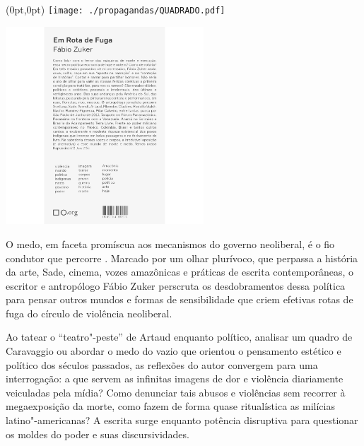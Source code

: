\pagestyle{quadrado}
\label{quadrado}

\begin{textblock*}{5.625in}(0pt,0pt)%
\vspace*{-3.5cm}
\hspace*{-2.77cm}\texttt{[image: ./propagandas/QUADRADO.pdf]}
\end{textblock*}

\pagebreak %

\begin{center}
\hspace*{-3.6cm}
\hspace*{3.1cm}\includegraphics[width=74mm]{./grid/zuker.jpg}
\end{center}

\hspace*{-7cm}\hrulefill\hspace*{-7cm}

\medskip

\noindent{}O medo, em faceta promíscua aos mecanismos do governo neoliberal, é o fio condutor que percorre {}. Marcado por um olhar plurívoco, que perpassa a história da arte, Sade, cinema, vozes amazônicas e práticas de escrita contemporâneas, o escritor e antropólogo Fábio Zuker perscruta os desdobramentos dessa política para pensar outros mundos e formas de sensibilidade que criem efetivas rotas de fuga do círculo de violência neoliberal.

Ao tatear o “teatro"-peste” de Artaud enquanto político, analisar um quadro de Caravaggio ou abordar o medo do vazio que orientou o pensamento estético e político dos séculos passados, as reflexões do autor convergem para uma interrogação: a que servem as infinitas imagens de dor e violência diariamente veiculadas pela mídia? Como denunciar tais abusos e violências sem recorrer à megaexposição da morte, como fazem de forma quase ritualística as milícias latino"-americanas? A escrita surge enquanto potência disruptiva para questionar os moldes do poder e suas discursividades.

